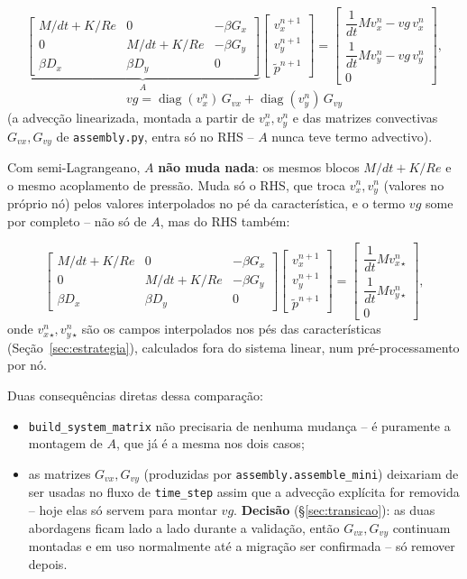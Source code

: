 \documentclass[11pt,a4paper]{article}
\newcommand{\vx}{v_x}
\newcommand{\vy}{v_y}
\begin{document}
\[
\underbrace{\begin{bmatrix}
M/dt + K/Re & 0 & -\beta G_x \\
0 & M/dt + K/Re & -\beta G_y \\
\beta D_x & \beta D_y & 0
\end{bmatrix}}_{A}
\begin{bmatrix} \vx^{n+1} \\ \vy^{n+1} \\ \tilde p^{n+1} \end{bmatrix}
=
\begin{bmatrix}
\dfrac{1}{dt} M \vx^{n} - vg\,\vx^{n} \\[4pt]
\dfrac{1}{dt} M \vy^{n} - vg\,\vy^{n} \\[4pt]
0
\end{bmatrix},
\]
\[
vg = \operatorname{diag}(\vx^{n})\,G_{vx} + \operatorname{diag}(\vy^{n})\,G_{vy}
\]
(a advecção linearizada, montada a partir de $\vx^n, \vy^n$ e das
matrizes convectivas $G_{vx}, G_{vy}$ de \texttt{assembly.py}, entra
só no RHS -- $A$ nunca teve termo advectivo).

Com semi-Lagrangeano, $A$ \textbf{não muda nada}: os mesmos blocos
$M/dt + K/Re$ e o mesmo acoplamento de pressão. Muda só o RHS, que
troca $\vx^n, \vy^n$ (valores no próprio nó) pelos valores
interpolados no pé da característica, e o termo $vg$ some por
completo -- não só de $A$, mas do RHS também:

\[
\begin{bmatrix}
M/dt + K/Re & 0 & -\beta G_x \\
0 & M/dt + K/Re & -\beta G_y \\
\beta D_x & \beta D_y & 0
\end{bmatrix}
\begin{bmatrix} \vx^{n+1} \\ \vy^{n+1} \\ \tilde p^{n+1} \end{bmatrix}
=
\begin{bmatrix}
\dfrac{1}{dt} M \vx^{n}_\star \\[4pt]
\dfrac{1}{dt} M \vy^{n}_\star \\[4pt]
0
\end{bmatrix},
\]
onde $\vx^n_\star, \vy^n_\star$ são os campos interpolados nos pés das
características (Seção~\ref{sec:estrategia}), calculados fora do
sistema linear, num pré-processamento por nó.

Duas consequências diretas dessa comparação:
\begin{itemize}
  \item \texttt{build\_system\_matrix} não precisaria de nenhuma
    mudança -- é puramente a montagem de $A$, que já é a mesma nos
    dois casos;
  \item as matrizes $G_{vx}, G_{vy}$ (produzidas por
    \texttt{assembly.assemble\_mini}) deixariam de ser usadas no
    fluxo de \texttt{time\_step} assim que a advecção explícita for
    removida -- hoje elas só servem para montar $vg$. \textbf{Decisão}
    (\S\ref{sec:transicao}): as duas abordagens ficam lado a lado
    durante a validação, então $G_{vx}, G_{vy}$ continuam montadas e
    em uso normalmente até a migração ser confirmada -- só remover
    depois.
\end{itemize}
\end{document}
